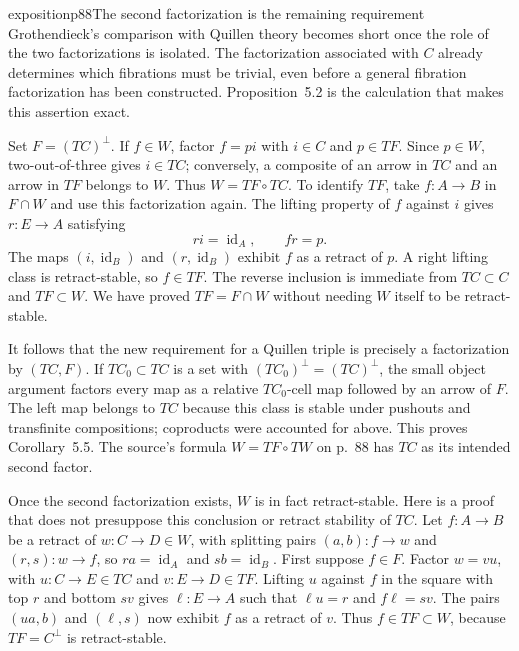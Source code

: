 \begin{dcomment}{exposition}{p88}{The second factorization is the remaining requirement}
Grothendieck's comparison with Quillen theory becomes short once the role of the two factorizations is isolated. The factorization associated with $C$ already determines which fibrations must be trivial, even before a general fibration factorization has been constructed. Proposition~5.2 is the calculation that makes this assertion exact.

Set $F=(TC)^{\perp}$. If $f\in W$, factor $f=pi$ with $i\in C$ and $p\in TF$. Since $p\in W$, two-out-of-three gives $i\in TC$; conversely, a composite of an arrow in $TC$ and an arrow in $TF$ belongs to $W$. Thus $W=TF\circ TC$. To identify $TF$, take $f:A\to B$ in $F\cap W$ and use this factorization again. The lifting property of $f$ against $i$ gives $r:E\to A$ satisfying
\[
 ri=\operatorname{id}_A,\qquad fr=p.
\]
The maps $(i,\operatorname{id}_B)$ and $(r,\operatorname{id}_B)$ exhibit $f$ as a retract of $p$. A right lifting class is retract-stable, so $f\in TF$. The reverse inclusion is immediate from $TC\subset C$ and $TF\subset W$. We have proved $TF=F\cap W$ without needing $W$ itself to be retract-stable.

It follows that the new requirement for a Quillen triple is precisely a factorization by $(TC,F)$. If $TC_0\subset TC$ is a set with $(TC_0)^{\perp}=(TC)^{\perp}$, the small object argument factors every map as a relative $TC_0$-cell map followed by an arrow of $F$. The left map belongs to $TC$ because this class is stable under pushouts and transfinite compositions; coproducts were accounted for above. This proves Corollary~5.5. The source's formula $W=TF\circ TW$ on p.~88 has $TC$ as its intended second factor.

Once the second factorization exists, $W$ is in fact retract-stable. Here is a proof that does not presuppose this conclusion or retract stability of $TC$. Let $f:A\to B$ be a retract of $w:C\to D\in W$, with splitting pairs $(a,b):f\to w$ and $(r,s):w\to f$, so $ra=\operatorname{id}_A$ and $sb=\operatorname{id}_B$. First suppose $f\in F$. Factor $w=vu$, with $u:C\to E\in TC$ and $v:E\to D\in TF$. Lifting $u$ against $f$ in the square with top $r$ and bottom $sv$ gives $\ell:E\to A$ such that $\ell u=r$ and $f\ell=sv$. The pairs $(ua,b)$ and $(\ell,s)$ now exhibit $f$ as a retract of $v$. Thus $f\in TF\subset W$, because $TF=C^{\perp}$ is retract-stable.


\end{dcomment}
